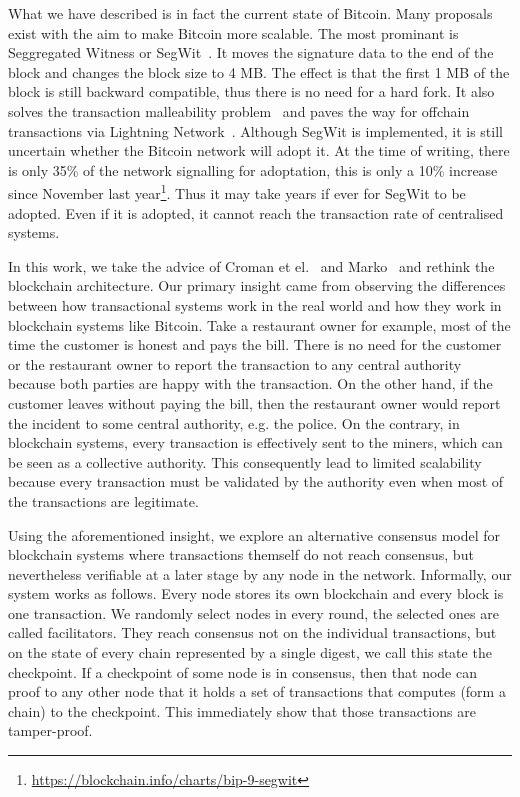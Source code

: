 What we have described is in fact the current state of Bitcoin.
Many proposals exist with the aim to make Bitcoin more scalable.
The most prominant is Seggregated Witness or SegWit~\cite{segwit}.
It moves the signature data to the end of the block and changes the block size to 4 MB.
The effect is that the first 1 MB of the block is still backward compatible, thus there is no need for a hard fork.
It also solves the transaction malleability problem~\cite{bitcoinmalleability} and paves the way for offchain transactions via Lightning Network~\cite{lightningnetwork}.
Although SegWit is implemented, it is still uncertain whether the Bitcoin network will adopt it.
At the time of writing, there is only 35\% of the network signalling for adoptation,
this is only a 10\% increase since November last year\footnote{\url{https://blockchain.info/charts/bip-9-segwit}}.
Thus it may take years if ever for SegWit to be adopted.
Even if it is adopted, it cannot reach the transaction rate of centralised systems.

In this work, we take the advice of Croman et el.~\cite{croman2016scaling} and Marko~\cite{vukolic2015quest} and rethink the blockchain architecture.
Our primary insight came from observing the differences between how transactional systems work in the real world and how they work in blockchain systems like Bitcoin. 
Take a restaurant owner for example, most of the time the customer is honest and pays the bill.
There is no need for the customer or the restaurant owner to report the transaction to any central authority 
because both parties are happy with the transaction.
On the other hand, if the customer leaves without paying the bill,
then the restaurant owner would report the incident to some central authority, e.g. the police.
On the contrary, in blockchain systems, every transaction is effectively sent to the miners,
which can be seen as a collective authority.
This consequently lead to limited scalability because every transaction must be validated by the authority even when most of the transactions are legitimate.

Using the aforementioned insight,
we explore an alternative consensus model for blockchain systems where transactions themself do not reach consensus,
but nevertheless verifiable at a later stage by any node in the network.
Informally, our system works as follows.
Every node stores its own blockchain and every block is one transaction.
We randomly select nodes in every round, the selected ones are called facilitators.
They reach consensus not on the individual transactions,
but on the state of every chain represented by a single digest, we call this state the checkpoint.
If a checkpoint of some node is in consensus, 
then that node can proof to any other node that it holds a set of transactions that computes (form a chain) to the checkpoint.
This immediately show that those transactions are tamper-proof.

